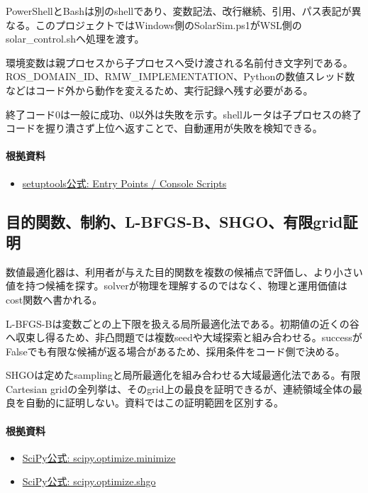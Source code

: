 \documentclass[a4paper,11pt]{article}
\begin{document}
PowerShellとBashは別のshellであり、変数記法、改行継続、引用、パス表記が異なる。このプロジェクトではWindows側のSolarSim.ps1がWSL側のsolar\_control.shへ処理を渡す。


環境変数は親プロセスから子プロセスへ受け渡される名前付き文字列である。ROS\_DOMAIN\_ID、RMW\_IMPLEMENTATION、Pythonの数値スレッド数などはコード外から動作を変えるため、実行記録へ残す必要がある。


終了コード0は一般に成功、0以外は失敗を示す。shellルータは子プロセスの終了コードを握り潰さず上位へ返すことで、自動運用が失敗を検知できる。

\paragraph{根拠資料}
\begin{itemize}[leftmargin=1.6em]
\item \href{https://setuptools.pypa.io/en/latest/userguide/entry_point.html}{setuptools公式: Entry Points / Console Scripts}
\end{itemize}

\subsection{目的関数、制約、L-BFGS-B、SHGO、有限grid証明}
数値最適化器は、利用者が与えた目的関数を複数の候補点で評価し、より小さい値を持つ候補を探す。solverが物理を理解するのではなく、物理と運用価値はcost関数へ書かれる。


L-BFGS-Bは変数ごとの上下限を扱える局所最適化法である。初期値の近くの谷へ収束し得るため、非凸問題では複数seedや大域探索と組み合わせる。successがFalseでも有限な候補が返る場合があるため、採用条件をコード側で決める。


SHGOは定めたsamplingと局所最適化を組み合わせる大域最適化法である。有限Cartesian gridの全列挙は、そのgrid上の最良を証明できるが、連続領域全体の最良を自動的に証明しない。資料ではこの証明範囲を区別する。

\paragraph{根拠資料}
\begin{itemize}[leftmargin=1.6em]
\item \href{https://docs.scipy.org/doc/scipy/reference/generated/scipy.optimize.minimize.html}{SciPy公式: scipy.optimize.minimize}
\item \href{https://docs.scipy.org/doc/scipy/reference/generated/scipy.optimize.shgo.html}{SciPy公式: scipy.optimize.shgo}
\end{itemize}
\end{document}
